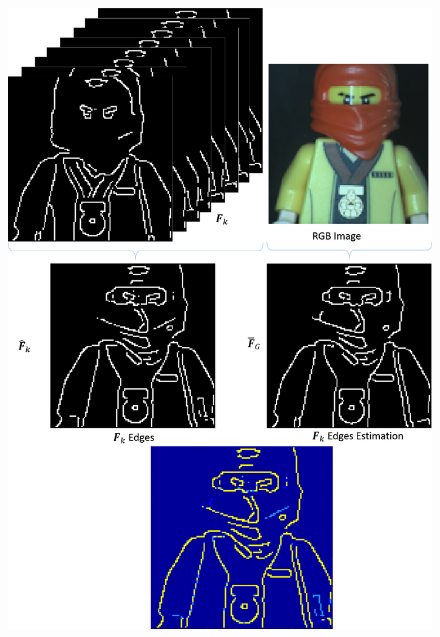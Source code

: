 \documentclass{beamer}
\begin{document}
\begin{frame}
\begin{columns}
\column{3in}
\begin{figure}
\includegraphics[scale=0.22]{FiguresUpd/edgesestimation.png}
\end{figure}

\end{columns}
 
\end{frame}

\end{document}
